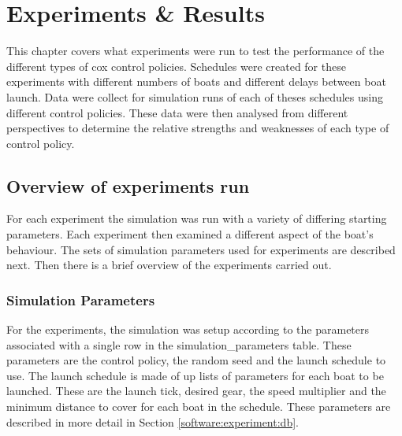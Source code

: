 \chapter{Experiments \& Results}\label{chapter:experiments}

This chapter covers what experiments were run to test the performance of the different types of cox control policies. Schedules were created for these experiments with different numbers of boats and different delays between boat launch. Data were collect for simulation runs of each of theses schedules using different control policies. These data were then analysed from different perspectives to determine the relative strengths and weaknesses of each type of control policy.

\section{Overview of experiments run}
  For each experiment the simulation was run with a variety of
  differing starting parameters. Each experiment then examined a
  different aspect of the boat's behaviour. The sets of simulation
  parameters used for experiments are described next. Then there is a
  brief overview of the experiments carried out.

  \subsection{Simulation Parameters}
  For the experiments, the simulation was setup according to the
  parameters associated with a single row in the
  simulation\_parameters table. These parameters are the control
  policy, the random seed and the launch schedule to use. The launch
  schedule is made of up lists of parameters for each boat to be
  launched. These are the launch tick, desired gear, the speed
  multiplier and the minimum distance to cover for each boat in the
  schedule. These parameters are described in more detail in Section \ref{software:experiment:db}.
  
